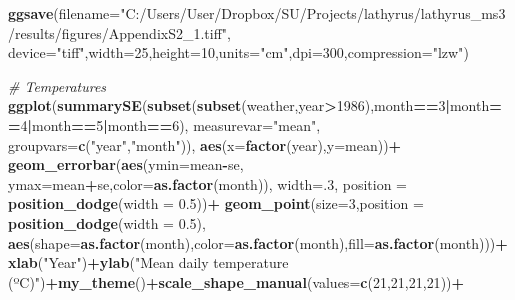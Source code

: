 \documentclass[
]{article}
\newenvironment{Shaded}{\begin{snugshade}}{\end{snugshade}}
\newcommand{\CommentTok}[1]{\textcolor[rgb]{0.56,0.35,0.01}{\textit{#1}}}
\newcommand{\DataTypeTok}[1]{\textcolor[rgb]{0.13,0.29,0.53}{#1}}
\newcommand{\DecValTok}[1]{\textcolor[rgb]{0.00,0.00,0.81}{#1}}
\newcommand{\FloatTok}[1]{\textcolor[rgb]{0.00,0.00,0.81}{#1}}
\newcommand{\KeywordTok}[1]{\textcolor[rgb]{0.13,0.29,0.53}{\textbf{#1}}}
\newcommand{\NormalTok}[1]{#1}
\newcommand{\OperatorTok}[1]{\textcolor[rgb]{0.81,0.36,0.00}{\textbf{#1}}}
\newcommand{\StringTok}[1]{\textcolor[rgb]{0.31,0.60,0.02}{#1}}
\begin{document}
\begin{Shaded}
\begin{Highlighting}[]
\KeywordTok{ggsave}\NormalTok{(}\DataTypeTok{filename=}\StringTok{"C:/Users/User/Dropbox/SU/Projects/lathyrus/lathyrus_ms3/results/figures/AppendixS2_1.tiff"}\NormalTok{,}
       \DataTypeTok{device=}\StringTok{"tiff"}\NormalTok{,}\DataTypeTok{width=}\DecValTok{25}\NormalTok{,}\DataTypeTok{height=}\DecValTok{10}\NormalTok{,}\DataTypeTok{units=}\StringTok{"cm"}\NormalTok{,}\DataTypeTok{dpi=}\DecValTok{300}\NormalTok{,}\DataTypeTok{compression=}\StringTok{"lzw"}\NormalTok{)}

\CommentTok{# Temperatures}
\KeywordTok{ggplot}\NormalTok{(}\KeywordTok{summarySE}\NormalTok{(}\KeywordTok{subset}\NormalTok{(}\KeywordTok{subset}\NormalTok{(weather,year}\OperatorTok{>}\DecValTok{1986}\NormalTok{),month}\OperatorTok{==}\DecValTok{3}\OperatorTok{|}\NormalTok{month}\OperatorTok{==}\DecValTok{4}\OperatorTok{|}\NormalTok{month}\OperatorTok{==}\DecValTok{5}\OperatorTok{|}\NormalTok{month}\OperatorTok{==}\DecValTok{6}\NormalTok{), }
                 \DataTypeTok{measurevar=}\StringTok{"mean"}\NormalTok{, }\DataTypeTok{groupvars=}\KeywordTok{c}\NormalTok{(}\StringTok{"year"}\NormalTok{,}\StringTok{"month"}\NormalTok{)),}
       \KeywordTok{aes}\NormalTok{(}\DataTypeTok{x=}\KeywordTok{factor}\NormalTok{(year),}\DataTypeTok{y=}\NormalTok{mean))}\OperatorTok{+}
\StringTok{  }\KeywordTok{geom_errorbar}\NormalTok{(}\KeywordTok{aes}\NormalTok{(}\DataTypeTok{ymin=}\NormalTok{mean}\OperatorTok{-}\NormalTok{se, }\DataTypeTok{ymax=}\NormalTok{mean}\OperatorTok{+}\NormalTok{se,}\DataTypeTok{color=}\KeywordTok{as.factor}\NormalTok{(month)), }\DataTypeTok{width=}\NormalTok{.}\DecValTok{3}\NormalTok{,}
                \DataTypeTok{position =} \KeywordTok{position_dodge}\NormalTok{(}\DataTypeTok{width =} \FloatTok{0.5}\NormalTok{))}\OperatorTok{+}
\StringTok{  }\KeywordTok{geom_point}\NormalTok{(}\DataTypeTok{size=}\DecValTok{3}\NormalTok{,}\DataTypeTok{position =} \KeywordTok{position_dodge}\NormalTok{(}\DataTypeTok{width =} \FloatTok{0.5}\NormalTok{),}
             \KeywordTok{aes}\NormalTok{(}\DataTypeTok{shape=}\KeywordTok{as.factor}\NormalTok{(month),}\DataTypeTok{color=}\KeywordTok{as.factor}\NormalTok{(month),}\DataTypeTok{fill=}\KeywordTok{as.factor}\NormalTok{(month)))}\OperatorTok{+}
\StringTok{  }\KeywordTok{xlab}\NormalTok{(}\StringTok{"Year"}\NormalTok{)}\OperatorTok{+}\KeywordTok{ylab}\NormalTok{(}\StringTok{"Mean daily temperature (ºC)"}\NormalTok{)}\OperatorTok{+}\KeywordTok{my_theme}\NormalTok{()}\OperatorTok{+}\KeywordTok{scale_shape_manual}\NormalTok{(}\DataTypeTok{values=}\KeywordTok{c}\NormalTok{(}\DecValTok{21}\NormalTok{,}\DecValTok{21}\NormalTok{,}\DecValTok{21}\NormalTok{,}\DecValTok{21}\NormalTok{))}\OperatorTok{+}

\end{Highlighting}
\end{Shaded}
\end{document}
